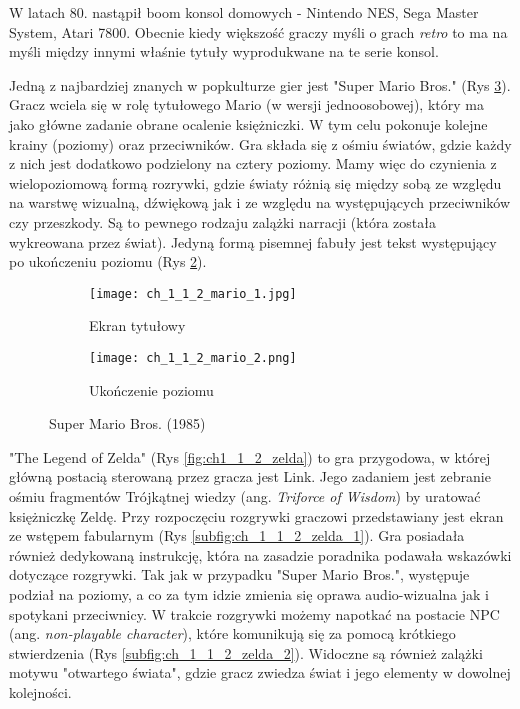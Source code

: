 \newpage

W latach 80. nastąpił boom konsol domowych - Nintendo NES, Sega Master System, Atari 7800\cite{the_evolution_of_video_games}.
Obecnie kiedy większość graczy myśli o grach \textit{retro} to ma na myśli między innymi właśnie tytuły
wyprodukwane na te serie konsol.

Jedną z najbardziej znanych w popkulturze gier jest "Super Mario Bros." (Rys \ref{fig:ch1_1_2_super_mario_bros}).
Gracz wciela się w rolę tytułowego Mario (w wersji jednoosobowej), który ma jako główne zadanie obrane
ocalenie księżniczki. W tym celu pokonuje kolejne krainy (poziomy) oraz przeciwników. Gra składa się z ośmiu
światów, gdzie każdy z nich jest dodatkowo podzielony na cztery poziomy. Mamy więc do czynienia z
wielopoziomową formą rozrywki, gdzie światy różnią się między sobą ze względu na warstwę wizualną, dźwiękową
jak i ze względu na występujących przeciwników czy przeszkody. Są to pewnego rodzaju zalążki narracji
(która została wykreowana przez świat). Jedyną formą pisemnej fabuły jest tekst występujący po ukończeniu
poziomu (Rys \ref{subfig:ch_1_1_2_mario_2}).

\begin{figure}[h]
	\begin{subfigure}{0.49\textwidth}
		\caption{Ekran tytułowy}
		\texttt{[image: ch\_1\_1\_2\_mario\_1.jpg]}
		\label{subfig:ch_1_1_2_mario_1}
	\end{subfigure}
	\begin{subfigure}{0.49\textwidth}
		\caption{Ukończenie poziomu}
		\texttt{[image: ch\_1\_1\_2\_mario\_2.png]}
		\label{subfig:ch_1_1_2_mario_2}
	\end{subfigure}
	\caption{Super Mario Bros. (1985)}
	\label{fig:ch1_1_2_super_mario_bros}
\end{figure}

"The Legend of Zelda" (Rys \ref{fig:ch1_1_2_zelda}) to gra przygodowa, w której główną postacią sterowaną
przez gracza jest Link. Jego zadaniem jest zebranie ośmiu fragmentów Trójkątnej wiedzy
(ang. \textit{Triforce of Wisdom}) by uratować księżniczkę Zeldę. Przy rozpoczęciu rozgrywki graczowi
przedstawiany jest ekran ze wstępem fabularnym (Rys \ref{subfig:ch_1_1_2_zelda_1}). Gra posiadała
również dedykowaną instrukcję, która na zasadzie poradnika podawała wskazówki dotyczące rozgrywki.
Tak jak w przypadku "Super Mario Bros.", występuje podział na poziomy, a co za tym idzie zmienia się
oprawa audio-wizualna jak i spotykani przeciwnicy. W trakcie rozgrywki możemy napotkać na postacie
NPC (ang. \textit{non-playable character}), które komunikują się za pomocą krótkiego stwierdzenia
(Rys \ref{subfig:ch_1_1_2_zelda_2}). Widoczne są również zalążki motywu "otwartego świata", gdzie gracz
zwiedza świat i jego elementy w dowolnej kolejności.

